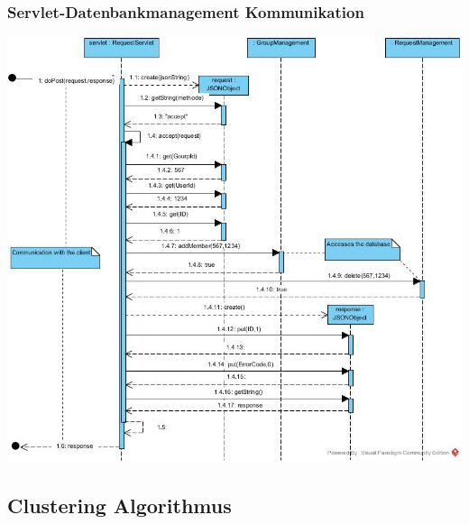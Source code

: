 \hyperlink{ServletDatenbank}{}
\subsubsection{Servlet-Datenbankmanagement Kommunikation}

\includegraphics[width=1.1\textwidth]{Servlet_MAnagement.jpg}


\subsection{Clustering Algorithmus}
	
	\newpage